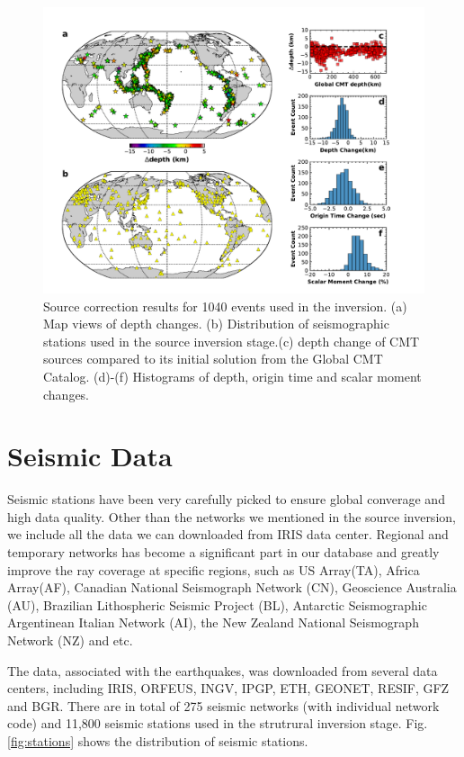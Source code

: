 \documentclass[extra,mreferee]{gji}
\begin{document}
\begin{figure}
  \centering
  \includegraphics[width=\textwidth]{figures/source_corrections.pdf}
  \caption{Source correction results for 1040 events used in the inversion. (a) Map views of depth changes. (b) Distribution of seismographic stations used in the source inversion stage.(c) depth change of CMT sources compared to its initial solution from the Global CMT Catalog. (d)-(f) Histograms of depth, origin time and scalar moment changes.}
  \label{fig:source_correction}
\end{figure}

\section{Seismic Data}

Seismic stations have been very carefully picked to ensure global converage and high data quality.
Other than the networks we mentioned in the source inversion, we include all the data we can
downloaded from IRIS data center. Regional and temporary networks has become a significant part
in our database and greatly improve the ray coverage at specific regions, such as US Array(TA),
Africa Array(AF), Canadian National Seismograph Network (CN), Geoscience Australia (AU),
Brazilian Lithospheric Seismic Project (BL), Antarctic Seismographic Argentinean Italian Network (AI),
the New Zealand National Seismograph Network (NZ) and etc.

The data, associated with the earthquakes, was downloaded from several data centers,
including IRIS, ORFEUS, INGV, IPGP, ETH, GEONET, RESIF, GFZ and BGR.
There are in total of 275 seismic networks (with individual network code) and 11,800
seismic stations used in the strutrural inversion stage. Fig.\ref{fig:stations}
shows the distribution of seismic stations.
\end{document}
